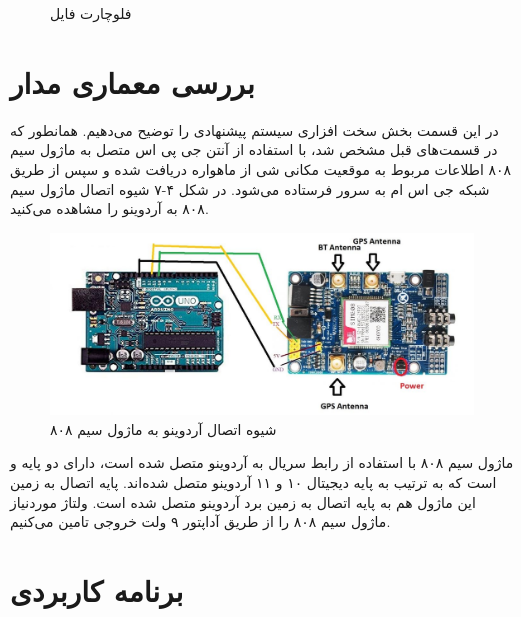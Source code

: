 \begin{figure}[h!]
	\caption{فلوچارت فایل   \cite{ElShafee2013}}
\end{figure}
\section{بررسی معماری مدار}
در این قسمت بخش سخت‌ افزاری سیستم پیشنهادی را توضیح می‌دهیم. همانطور که در قسمت‌های قبل مشخص شد، با استفاده از آنتن جی‌ پی اس متصل به ماژول سیم ۸۰۸ اطلاعات مربوط به موقعیت مکانی شی از ماهواره دریافت شده و سپس از طریق شبکه جی اس ام به سرور فرستاده می‌شود. در شکل ۴-۷ شیوه اتصال ماژول سیم ۸۰۸ به آردوینو را مشاهده می‌کنید.
\\
\begin{figure}[!h]
	\centerline{\includegraphics[width=.6\textwidth]{sim808-arduino}}
	\caption{شیوه اتصال آردوینو به ماژول سیم ۸۰۸\cite{interface}}
\end{figure}


ماژول سیم ۸۰۸ با استفاده از رابط سریال به آردوینو متصل شده است، دارای دو پایه  و  است که به ترتیب به پایه دیجیتال ۱۰ و ۱۱ آردوینو متصل شده‌اند. پایه اتصال به زمین این ماژول هم به پایه اتصال به زمین برد آردوینو متصل شده است. ولتاژ موردنیاز ماژول سیم ۸۰۸ را از طریق آداپتور ۹ ولت خروجی تامین می‌کنیم. 
\section{برنامه کاربردی}